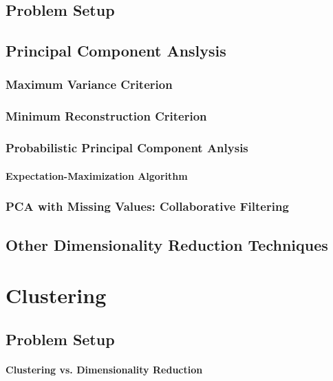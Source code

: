 \documentclass{report}
\begin{document}
\subsection{Problem Setup}

\subsection{Principal Component Anslysis}

\subsubsection{Maximum Variance Criterion}

\subsubsection{Minimum Reconstruction Criterion}

\subsubsection{Probabilistic Principal Component Anlysis}

\paragraph{Expectation-Maximization Algorithm}

\subsubsection{PCA with Missing Values: Collaborative Filtering}

\subsection{Other Dimensionality Reduction Techniques}


\section{Clustering}
\label{sec:cluster}

\subsection{Problem Setup}

\paragraph{Clustering vs. Dimensionality Reduction}
\end{document}
